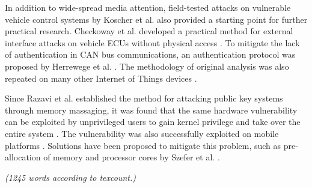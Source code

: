 \documentclass[11pt]{article}
\begin{document}
In addition to wide-spread media attention, field-tested attacks on vulnerable vehicle control systems by Koscher et al. \cite{koscher2010experimental} also provided a starting point for further practical research. Checkoway et al. developed a practical method for external interface attacks on vehicle ECUs without physical access \cite{checkoway2011comprehensive}. To mitigate the lack of authentication in CAN bus communications, an authentication protocol was proposed by Herrewege et al. \cite{van2011canauth}. The methodology of original analysis was also repeated on many other Internet of Things devices \cite{sadeghi2015security}.

Since Razavi et al. \cite{razavi2016flip} established the method for attacking public key systems through memory massaging, it was found that the same hardware vulnerability can be exploited by unprivileged users to gain kernel privilege and take over the entire system \cite[II. B.]{mutlu2017rowhammer}. The vulnerability was also successfully exploited on mobile platforms \cite{van2016drammer}. Solutions have been proposed to mitigate this problem, such as pre-allocation of memory and processor cores by Szefer et al. \cite{szefer2011eliminating}. 

\emph{(1245 words according to texcount.)}


\footnotesize{}
\end{document}
